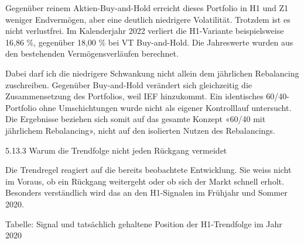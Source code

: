 \documentclass[
  ngerman,
  a4paper,
  DIV=11,
  oneside]{scrreprt}
\begin{document}
Gegenüber reinem Aktien-Buy-and-Hold erreicht dieses Portfolio in H1 und
Z1 weniger Endvermögen, aber eine deutlich niedrigere Volatilität.
Trotzdem ist es nicht verlustfrei. Im Kalenderjahr 2022 verliert die
H1-Variante beispielsweise 16,86 \%, gegenüber 18,00 \% bei VT
Buy-and-Hold. Die Jahreswerte wurden aus den bestehenden
Vermögensverläufen berechnet.

Dabei darf ich die niedrigere Schwankung nicht allein dem jährlichen
Rebalancing zuschreiben. Gegenüber Buy-and-Hold verändert sich
gleichzeitig die Zusammensetzung des Portfolios, weil IEF hinzukommt.
Ein identisches 60/40-Portfolio ohne Umschichtungen wurde nicht als
eigener Kontrolllauf untersucht. Die Ergebnisse beziehen sich somit auf
das gesamte Konzept «60/40 mit jährlichem Rebalancing», nicht auf den
isolierten Nutzen des Rebalancings.

5.13.3 Warum die Trendfolge nicht jeden Rückgang vermeidet

Die Trendregel reagiert auf die bereits beobachtete Entwicklung. Sie
weiss nicht im Voraus, ob ein Rückgang weitergeht oder ob sich der Markt
schnell erholt. Besonders verständlich wird das an den H1-Signalen im
Frühjahr und Sommer 2020.

Tabelle: Signal und tatsächlich gehaltene Position der H1-Trendfolge im
Jahr 2020
\end{document}
